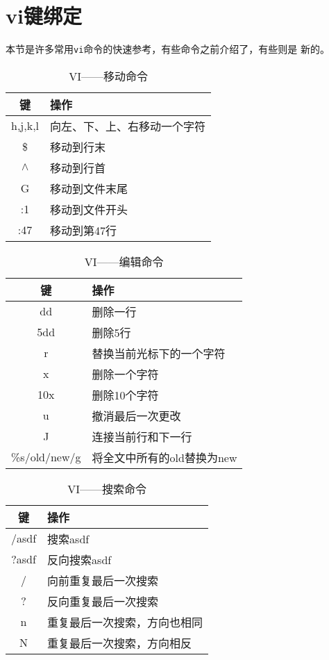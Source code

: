 \section{vi键绑定}
\label{sec:vi:keys}
本节是许多常用\texttt{vi}命令的快速参考，有些命令之前介绍了，有些则是
新的。
\begin{table}[ht]
  \centering
  \begin{tabular}{c|l}
  \hline\hline
  键 & 操作 \\ \hline
  h,j,k,l & 向左、下、上、右移动一个字符 \\
  \$ & 移动到行末 \\
  $\wedge$ & 移动到行首 \\
  G & 移动到文件末尾 \\
  :1 & 移动到文件开头 \\
  :47 & 移动到第47行 \\
  \hline\hline
\end{tabular}

  \caption{VI——移动命令}
  \label{tab:vi-movement}
\end{table}

\begin{table}[htpb]
  \centering
  \begin{tabular}{c|l}
    \hline \hline
    键 & 操作 \\ \hline
    dd & 删除一行 \\
    5dd & 删除5行 \\
    r & 替换当前光标下的一个字符 \\
    x & 删除一个字符 \\
    10x & 删除10个字符 \\
    u & 撤消最后一次更改 \\
    J & 连接当前行和下一行 \\
    \%s/old/new/g & 将全文中所有的old替换为new \\
    \hline \hline
  \end{tabular}
  \caption{VI——编辑命令}
  \label{tab:vi-edit}
\end{table}

\begin{table}[htpb]
  \centering
  \begin{tabular}{c|l}
    \hline \hline
    键 & 操作 \\ \hline
    /asdf & 搜索asdf \\
    ?asdf & 反向搜索asdf \\
    / & 向前重复最后一次搜索 \\
    ? & 反向重复最后一次搜索 \\
    n & 重复最后一次搜索，方向也相同 \\
    N & 重复最后一次搜索，方向相反 \\
    \hline\hline
  \end{tabular}
  \caption{VI——搜索命令}
  \label{tab:vi-search}
\end{table}

